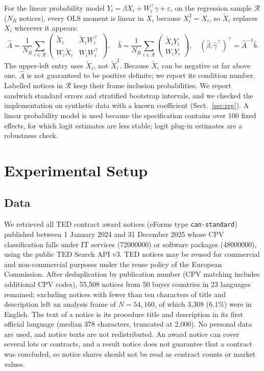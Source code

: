\documentclass[runningheads]{llncs}
\begin{document}
For the linear probability model $Y_i=\beta X_i+W_i^\top\gamma+\varepsilon_i$ on the regression sample $\mathcal{R}$ ($N_R$ notices), every OLS moment is linear in $X_i$ because $X_i^2=X_i$, so $\tilde{X}_i$ replaces $X_i$ wherever it appears:
\begin{equation}
\hat{A}=\frac{1}{N_R}\sum_{i\in\mathcal{R}}\begin{pmatrix}\tilde{X}_i & \tilde{X}_iW_i^\top\\ W_i\tilde{X}_i & W_iW_i^\top\end{pmatrix},\quad
\hat{b}=\frac{1}{N_R}\sum_{i\in\mathcal{R}}\begin{pmatrix}\tilde{X}_iY_i\\ W_iY_i\end{pmatrix},\quad
(\hat\beta,\hat\gamma^\top)^\top=\hat{A}^{-1}\hat{b}.
\label{eq:moments}
\end{equation}
The upper-left entry uses $\tilde{X}_i$, not $\tilde{X}_i^2$. Because $\tilde{X}_i$ can be negative or far above one, $\hat{A}$ is not guaranteed to be positive definite; we report its condition number. Labelled notices in $\mathcal{R}$ keep their frame inclusion probabilities. We report sandwich standard errors and stratified bootstrap intervals, and we checked the implementation on synthetic data with a known coefficient (Sect.~\ref{sec:reg}). A linear probability model is used because the specification contains over 100 fixed effects, for which logit estimates are less stable; logit plug-in estimates are a robustness check.

\section{Experimental Setup}
\subsection{Data}
We retrieved all TED contract award notices (eForms type \texttt{can-standard}) published between 1 January 2024 and 31 December 2025 whose CPV classification falls under IT services (72000000) or software packages (48000000), using the public TED Search API v3. TED notices may be reused for commercial and non-commercial purposes under the reuse policy of the European Commission. After deduplication by publication number (CPV matching includes additional CPV codes),
55,508 notices from 50 buyer countries in 23 languages remained; excluding notices with fewer than ten characters of title and description left an analysis frame of $N=54{,}160$, of which 3,308 (6.1\%) were in English. The text of a notice is its procedure title and description in its first official language (median 378 characters, truncated at 2,000). No personal data are used, and notice texts are not redistributed. An award notice can cover several lots or contracts, and a result notice does not guarantee that a contract was concluded, so notice shares should not be read as contract counts or market values.
\end{document}
